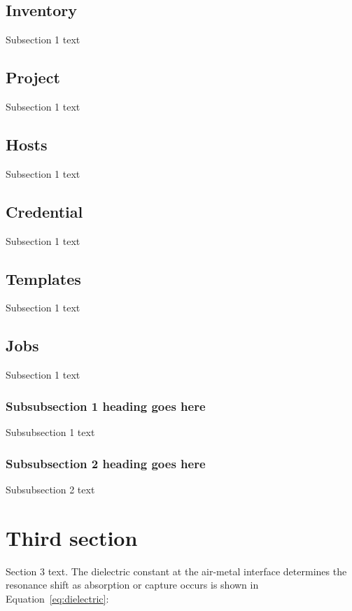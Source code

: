 \subsection{Inventory}

Subsection 1 text

\subsection{Project}

Subsection 1 text

\subsection{Hosts}

Subsection 1 text

\subsection{Credential}

Subsection 1 text

\subsection{Templates}

Subsection 1 text

\subsection{Jobs}

Subsection 1 text

\subsubsection{Subsubsection 1 heading goes here}
Subsubsection 1 text

\subsubsection{Subsubsection 2 heading goes here}
Subsubsection 2 text

\section{Third section}
Section 3 text. The dielectric constant
at the air-metal interface determines
the resonance shift as absorption or capture occurs
is shown in Equation~\eqref{eq:dielectric}:

